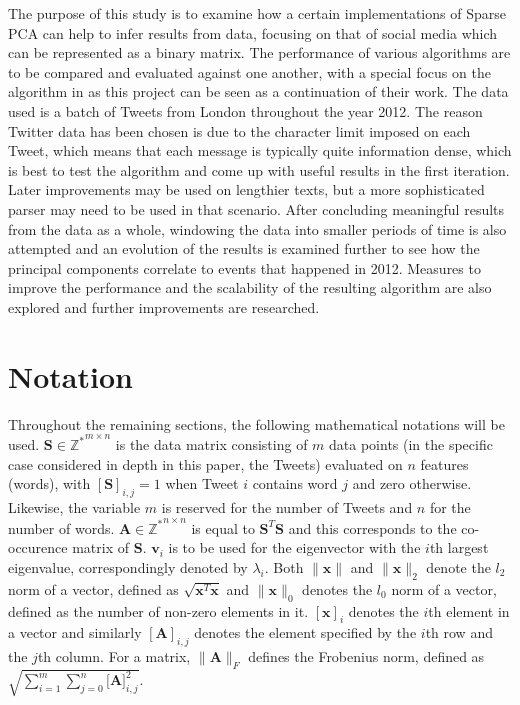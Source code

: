 \documentclass[11pt,a4paper]{article}
\begin{document}
The purpose of this study is to examine how a certain implementations of Sparse PCA can help to infer results from data, focusing on that of social media which can be represented as a binary matrix. The performance of various algorithms are to be compared and evaluated against one another, with a special focus on the algorithm in \cite{dimakis} as this project can be seen as a continuation of their work. The data used is a batch of Tweets from London throughout the year 2012. The reason Twitter data has been chosen is due to the character limit imposed on each Tweet, which means that each message is typically quite information dense, which is best to test the algorithm and come up with useful results in the first iteration. Later improvements may be used on lengthier texts, but a more sophisticated parser may need to be used in that scenario. After concluding meaningful results from the data as a whole, windowing the data into smaller periods of time is also attempted and an evolution of the results is examined further to see how the principal components correlate to events that happened in 2012. Measures to improve the performance and the scalability of the resulting algorithm are also explored and further improvements are researched.

\section{Notation}

Throughout the remaining sections, the following mathematical notations will be used. $\mathbf{S} \in \mathbb{Z^*}^{m\times n}$ is the data matrix consisting of $m$ data points (in the specific case considered in depth in this paper, the Tweets) evaluated on $n$ features (words), with $[\mathbf{S}]_{i,j} = 1$ when Tweet $i$ contains word $j$ and zero otherwise. Likewise, the variable $m$ is reserved for the number of Tweets and $n$ for the number of words. $\mathbf{A} \in \mathbb{Z^*}^{n \times n}$ is equal to $\mathbf{S}^T\mathbf{S}$ and this corresponds to the co-occurence matrix of $\mathbf{S}$. $\mathbf{v}_i$ is to be used for the eigenvector with the $i$th largest eigenvalue, correspondingly denoted by $\lambda_i$. Both $\|\mathbf{x}\|$ and $\|\mathbf{x}\|_2$ denote the $l_2$ norm of a vector, defined as $\sqrt{\mathbf{x}^T\mathbf{x}}$ and $\|\mathbf{x}\|_0$ denotes the $l_0$ norm of a vector, defined as the number of non-zero elements in it. $[\mathbf{x} ]_i$ denotes the $i$th element in a vector and similarly $[\mathbf{A}]_{i, j}$ denotes the element specified by the $i$th row and the $j$th column. For a matrix, $\|\mathbf{A}\|_F$ defines the Frobenius norm, defined as $\sqrt{\sum^m_{i=1}{\sum_{j=0}^n{\mathbf{[A}]_{i, j}^2}}}$.
\end{document}
